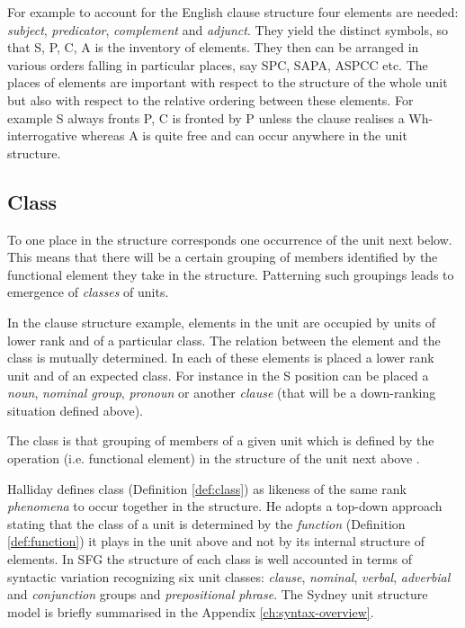 For example to account for the English clause structure four elements are needed: \textit{subject}, \textit{predicator}, \textit{complement} and \textit{adjunct}. They yield the distinct symbols, so that S, P, C, A is the inventory of elements. They then can be arranged in various orders falling in particular places, say SPC, SAPA, ASPCC etc. The places of elements are important with respect to the structure of the whole unit but also with respect to the relative ordering between these elements. For example S always fronts P, C is fronted by P unless the clause realises a Wh-interrogative whereas A is quite free and can occur anywhere in the unit structure. 

\subsection{Class}

To one place in the structure corresponds one occurrence of the unit next below. This means that there will be a certain grouping of members identified by the functional element they take in the structure. Patterning such groupings leads to emergence of \textit{classes} of units.

In the clause structure example, elements in the unit are occupied by units of lower rank and of a particular class. The relation between the element and the class is mutually determined. In each of these elements is placed a lower rank unit and of an expected class. For instance in the S position can be placed a \textit{noun}, \textit{nominal group}, \textit{pronoun} or another \textit{clause} (that will be a down-ranking situation defined above).

\begin{definition}[Class]\label{def:class}
	The class is that grouping of members of a given unit which is defined by the operation (i.e. functional element) in the structure of the unit next above \citep[49]{Halliday2002}.
\end{definition}

Halliday defines class (Definition \ref{def:class}) as likeness of the same rank \textit{phenomena} to occur together in the structure. He adopts a top-down approach stating that the class of a unit is determined by the \textit{function} (Definition \ref{def:function}) it plays in the unit above and not by its internal structure of elements. In SFG the structure of each class is well accounted in terms of syntactic variation recognizing six unit classes: \textit{clause}, \textit{nominal}, \textit{verbal}, \textit{adverbial} and \textit{conjunction} groups and \textit{prepositional phrase}. The Sydney unit structure model is briefly summarised in the Appendix \ref{ch:syntax-overview}.

